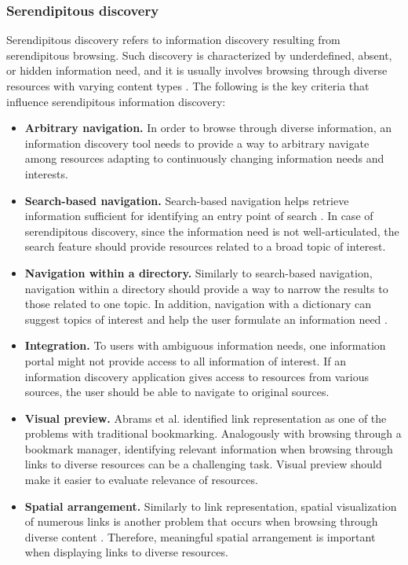\documentclass{casconpaper}
\begin{document}
{\subsubsection{Serendipitous discovery}
Serendipitous discovery refers to information discovery resulting from serendipitous  browsing. Such discovery is characterized by underdefined, absent, or hidden information need, and it is usually involves browsing through diverse resources with varying content types \cite{kellar2006}. The following is the key criteria that influence serendipitous information discovery:

\begin{itemize}
  \item \textbf{Arbitrary navigation.} In order to browse through diverse information, an information discovery tool needs to provide a way to arbitrary navigate among resources adapting to continuously changing information needs and interests.
  \item \textbf{Search-based navigation.} Search-based navigation helps retrieve information sufficient for identifying an entry point of search \cite{levene}. In case of serendipitous discovery, since the information need is not well-articulated, the search feature should provide resources related to a broad topic of interest.
  \item \textbf{Navigation within a directory.} Similarly to search-based navigation, navigation within a directory should provide a way to narrow the results to those related to one topic. In addition, navigation with a dictionary can suggest topics of interest and help the user formulate an information need \cite{levene}.
  \item \textbf{Integration.} To users with ambiguous information needs, one information portal might not provide access to all information of interest. If an information discovery application gives access to resources from various sources, the user should be able to navigate to original sources.
  \item \textbf{Visual preview.} Abrams et al. \cite{abrams} identified link representation as one of the problems with traditional bookmarking. Analogously with browsing through a bookmark manager, identifying relevant information when browsing through links to diverse resources can be a challenging task. Visual preview should make it easier to evaluate relevance of resources.
  \item \textbf{Spatial arrangement.} Similarly to link representation, spatial visualization of numerous links is another problem that occurs when browsing through diverse content \cite{abrams}. Therefore, meaningful spatial arrangement is important when displaying links to diverse resources.
\end{itemize}


} %
\end{document}
